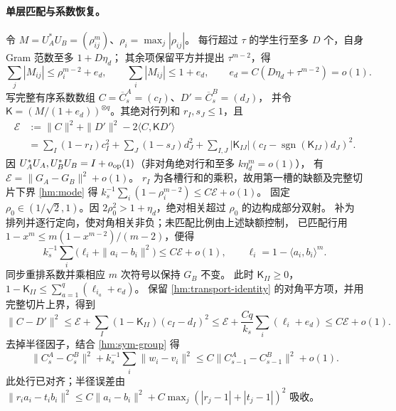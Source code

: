 \documentclass[a4paper]{tufte-handout}
\begin{document}
\begin{fullwidth}
\paragraph{单层匹配与系数恢复。}
令 $M=U_A^*U_B=(\rho_{ij}^m)$、$\rho_i=\max_j|\rho_{ij}|$。
每行超过 $\tau$ 的学生行至多 $D$ 个，自身 Gram 范数至多 $1+D\eta_d$；
其余项保留平方并提出 $\tau^{m-2}$，得
\begin{equation}\label{hm:cross-power}
 \sum_j|M_{ij}|\le\rho_i^{m-2}+e_d,\qquad
 \sum_i|M_{ij}|\le1+e_d,\qquad
 e_d=C(D\eta_d+\tau^{m-2})=o(1).
\end{equation}
写完整有序系数数组 $C=\overline C_s^A=(c_I)$、$D'=\overline C_s^B=(d_J)$，
并令 $\mathsf K=(M/(1+e_d))^{\otimes q}$。其绝对行列和 $r_I,s_J\le1$，且
\begin{equation}\label{hm:transport-identity}
 \begin{aligned}
 \mathcal E&:=\|C\|^2+\|D'\|^2-2\langle C,\mathsf K D'\rangle\\
 &=\sum_I(1-r_I)c_I^2+\sum_J(1-s_J)d_J^2
 +\sum_{I,J}|\mathsf K_{IJ}|(c_I-\operatorname{sgn}(\mathsf K_{IJ})d_J)^2.
 \end{aligned}
\end{equation}
因 $U_A^*U_A,U_B^*U_B=I+o_{\rm op}(1)$（非对角绝对行和至多 $k\eta_d^m=o(1)$），
有 $\mathcal E=\|G_A-G_B\|^2+o(1)$。
$r_I$ 为各槽行和的乘积，故用第一槽的缺额及完整切片下界 \eqref{hm:mode} 得
$k_s^{-1}\sum_i(1-\rho_i^{m-2})\le C\mathcal E+o(1)$。
固定 $\rho_0\in(1/\sqrt2,1)$。因 $2\rho_0^2>1+\eta_d$，绝对相关超过 $\rho_0$ 的边构成部分双射。
补为排列并逐行定向，使对角相关非负；未匹配比例由上述缺额控制，
已匹配行用 $1-x^m\le m(1-x^{m-2})/(m-2)$，便得
\begin{equation}\label{hm:row-loss}
 k_s^{-1}\sum_i\big(\ell_i+\|a_i-b_i\|^2\big)\le C\mathcal E+o(1),
 \qquad \ell_i=1-\langle a_i,b_i\rangle^m.
\end{equation}
同步重排系数并乘相应 $m$ 次符号以保持 $G_B$ 不变。
此时 $\mathsf K_{II}\ge0$，$1-\mathsf K_{II}\le\sum_{a=1}^q(\ell_{i_a}+e_d)$。
保留 \eqref{hm:transport-identity} 的对角平方项，并用完整切片上界，得到
\[
 \|C-D'\|^2\le\mathcal E+\sum_I(1-\mathsf K_{II})(c_I-d_I)^2
 \le\mathcal E+\frac{Cq}{k_s}\sum_i(\ell_i+e_d)\le C\mathcal E+o(1).
\]
去掉半径因子，结合 \eqref{hm:sym-group} 得
\begin{equation}\label{hm:recover}
 \|C_s^A-C_s^B\|^2+k_s^{-1}\sum_i\|w_i-v_i\|^2
 \le C\|C_{s-1}^A-C_{s-1}^B\|^2+o(1).
\end{equation}
此处行已对齐；半径误差由
$\|r_ia_i-t_ib_i\|^2\le C\|a_i-b_i\|^2+C\max_j(|r_j-1|+|t_j-1|)^2$ 吸收。


\end{fullwidth}
\end{document}
